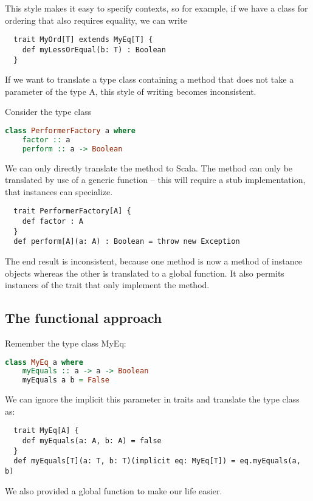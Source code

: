 This style makes it easy to specify contexts, so for example, if we have
a class  for ordering that also requires equality, we can write
\begin{lstlisting}
  trait MyOrd[T] extends MyEq[T] {
    def myLessOrEqual(b: T) : Boolean
  }
\end{lstlisting}

If we want to translate a type class containing a method that does not take a
parameter of the type A, this style of writing becomes inconsistent.

\begin{example} Consider the type class
\begin{lstlisting}[language=Haskell]
  class PerformerFactory a where
    factor :: a
    perform :: a -> Boolean
\end{lstlisting}
We can only directly translate the  method to Scala. The 
method can only be translated by use of a generic function -- this will
require a stub implementation, that instances can specialize.
\begin{lstlisting}
  trait PerformerFactory[A] {
    def factor : A
  }
  def perform[A](a: A) : Boolean = throw new Exception
\end{lstlisting}
The end result is inconsistent, because one method is now a method of
instance objects whereas the other is translated to a global function. It
also permits instances of the trait that only implement the 
method.
\end{example}
\subsection{The functional approach}
Remember the type class MyEq:
\begin{lstlisting}[language=Haskell]
  class MyEq a where
    myEquals :: a -> a -> Boolean
    myEquals a b = False
\end{lstlisting}
We can ignore the implicit this parameter in traits and translate the type
class as:
\begin{lstlisting}
  trait MyEq[A] {
    def myEquals(a: A, b: A) = false
  }
  def myEquals[T](a: T, b: T)(implicit eq: MyEq[T]) = eq.myEquals(a, b)
\end{lstlisting}
We also provided a global  function to make our life easier.

